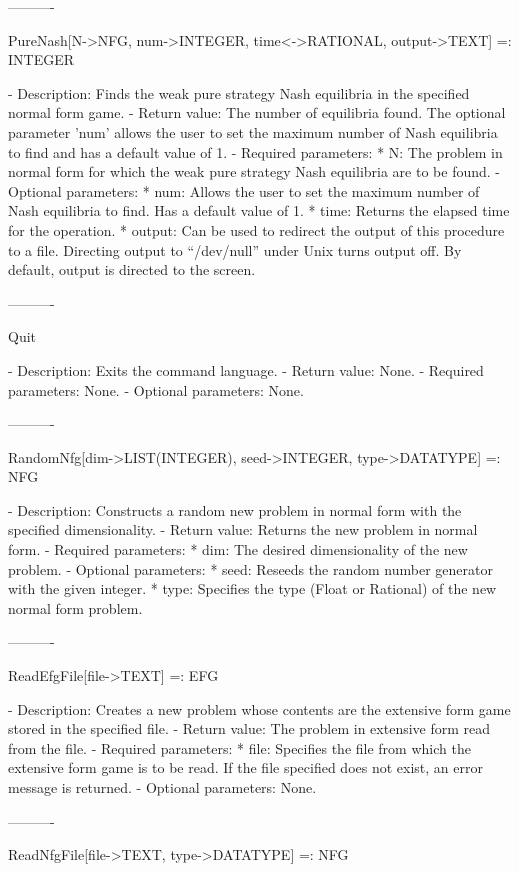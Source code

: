 \begin{itemize}
----------

PureNash[N->NFG, {num->INTEGER}, {time<->RATIONAL}, {output->TEXT}]
	 =: INTEGER

   -	Description:  Finds the weak pure strategy Nash equilibria in the 
	specified normal form game.  
   -	Return value:  The number of equilibria found.  The optional parameter 
	'num' allows the user to set the maximum number of Nash equilibria to 
	find and has a default value of 1.
   -	Required parameters:
	  *  N:  The problem in normal form for which the weak pure strategy
		Nash equilibria are to be found.
   -	Optional parameters:
	  *  num:  Allows the user to set the maximum number of Nash equilibria
		to find.  Has a default value of 1.
	  *  time:  Returns the elapsed time for the operation.
	  *  output:  Can be used to redirect the output of this procedure to a
		file.  Directing output to ``/dev/null'' under Unix turns 
		output off.  By default, output is directed to the screen.  

----------

Quit

   -	Description:  Exits the command language.
   -	Return value:  None.
   -	Required parameters:  None.
   -	Optional parameters:  None.

----------

RandomNfg[dim->LIST(INTEGER), {seed->INTEGER}, {type->DATATYPE}] =: NFG

   -	Description:  Constructs a random new problem in normal form with the 
	specified dimensionality.
   -	Return value:  Returns the new problem in normal form.
   -	Required parameters:
	  *  dim:  The desired dimensionality of the new problem.
   -	Optional parameters:
	  *  seed:  Reseeds the random number generator with the given integer.
	  *  type:  Specifies the type (Float or Rational) of the new normal 
		form problem.

----------

ReadEfgFile[file->TEXT] =: EFG

   -	Description:  Creates a new problem whose contents are the extensive 
	form game stored in the specified file.
   -	Return value:  The problem in extensive form read from the file.
   -	Required parameters:
	  *  file:  Specifies the file from which the extensive form game is to
		be read.  If the file specified does not exist, an error 
		message is returned.
   -	Optional parameters:  None.

----------

ReadNfgFile[file->TEXT, {type->DATATYPE}] =: NFG


\end{itemize}
